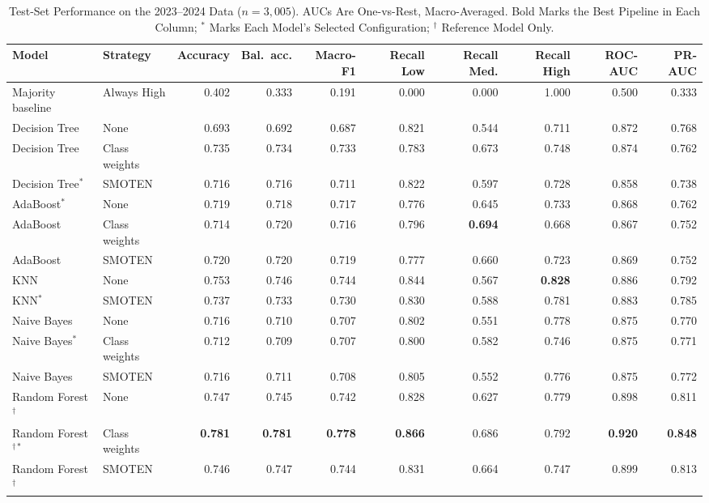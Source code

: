 \documentclass[conference]{IEEEtran}
\begin{document}
\begin{table}[t]
\caption{Test-Set Performance on the 2023--2024 Data ($n = 3{,}005$). AUCs Are One-vs-Rest, Macro-Averaged. Bold Marks the Best Pipeline in Each Column; $^\ast$ Marks Each Model's Selected Configuration; $^\dagger$ Reference Model Only.}
\label{tab:test}
\centering
\footnotesize
\setlength{\tabcolsep}{5pt}
\begin{tabular}{@{}llrrrrrrrr@{}}
\toprule
Model & Strategy & Accuracy & Bal.\ acc. & Macro-F1 & Recall Low & Recall Med. & Recall High & ROC-AUC & PR-AUC \\
\midrule
Majority baseline & Always High & 0.402 & 0.333 & 0.191 & 0.000 & 0.000 & 1.000 & 0.500 & 0.333 \\
\midrule
Decision Tree & None & 0.693 & 0.692 & 0.687 & 0.821 & 0.544 & 0.711 & 0.872 & 0.768 \\
Decision Tree & Class weights & 0.735 & 0.734 & 0.733 & 0.783 & 0.673 & 0.748 & 0.874 & 0.762 \\
Decision Tree$^\ast$ & SMOTEN & 0.716 & 0.716 & 0.711 & 0.822 & 0.597 & 0.728 & 0.858 & 0.738 \\
AdaBoost$^\ast$ & None & 0.719 & 0.718 & 0.717 & 0.776 & 0.645 & 0.733 & 0.868 & 0.762 \\
AdaBoost & Class weights & 0.714 & 0.720 & 0.716 & 0.796 & \textbf{0.694} & 0.668 & 0.867 & 0.752 \\
AdaBoost & SMOTEN & 0.720 & 0.720 & 0.719 & 0.777 & 0.660 & 0.723 & 0.869 & 0.752 \\
KNN & None & 0.753 & 0.746 & 0.744 & 0.844 & 0.567 & \textbf{0.828} & 0.886 & 0.792 \\
KNN$^\ast$ & SMOTEN & 0.737 & 0.733 & 0.730 & 0.830 & 0.588 & 0.781 & 0.883 & 0.785 \\
Naive Bayes & None & 0.716 & 0.710 & 0.707 & 0.802 & 0.551 & 0.778 & 0.875 & 0.770 \\
Naive Bayes$^\ast$ & Class weights & 0.712 & 0.709 & 0.707 & 0.800 & 0.582 & 0.746 & 0.875 & 0.771 \\
Naive Bayes & SMOTEN & 0.716 & 0.711 & 0.708 & 0.805 & 0.552 & 0.776 & 0.875 & 0.772 \\
\midrule
Random Forest$^\dagger$ & None & 0.747 & 0.745 & 0.742 & 0.828 & 0.627 & 0.779 & 0.898 & 0.811 \\
Random Forest$^{\dagger\ast}$ & Class weights & \textbf{0.781} & \textbf{0.781} & \textbf{0.778} & \textbf{0.866} & 0.686 & 0.792 & \textbf{0.920} & \textbf{0.848} \\
Random Forest$^\dagger$ & SMOTEN & 0.746 & 0.747 & 0.744 & 0.831 & 0.664 & 0.747 & 0.899 & 0.813 \\
\bottomrule
\end{tabular}
\end{table}
\end{document}
